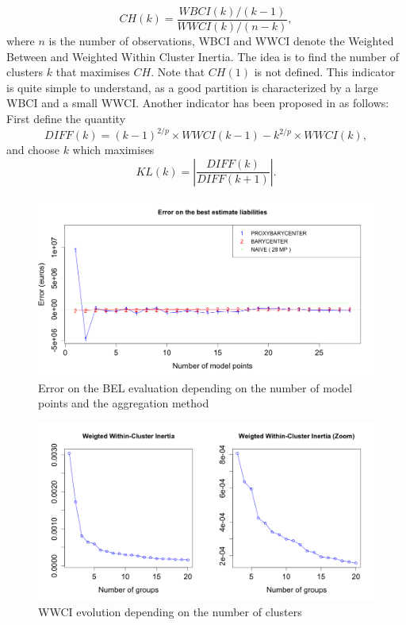 \begin{equation}\label{CH}
CH(k)=\frac{WBCI(k)/(k-1)}{WWCI(k)/(n-k)},
\end{equation}
where $n$ is the number of observations, WBCI and WWCI denote the Weighted Between and Weighted Within Cluster Inertia. The idea is to find the number of clusters $k$ that maximises $CH$. Note that $CH(1)$ is not defined. This indicator is quite simple to understand, as a good partition is characterized by a large WBCI and a small WWCI. Another indicator has been proposed in \citet{KrLa88} as follows: First define the quantity
\begin{equation}\label{CHDefinition}
DIFF(k)=(k-1)^{2/p}\times WWCI(k-1)-k^{2/p}\times WWCI(k),
\end{equation}
and choose $k$ which maximises
\begin{equation}\label{KLDefinition}
KL(k)=\left|\frac{DIFF(k)}{DIFF(k+1)} \right|.
\end{equation}
\begin{center}
	\begin{figure}[ht!]
		\begin{center}
			\includegraphics[width=15cm]{Chapitre6/EcartBel.png}
			\caption{Error on the BEL evaluation depending on the number of model points and the aggregation method}
			\label{BELError}
		\end{center}
	\end{figure}
\end{center}
\begin{center}
	\begin{figure}[ht!]
		\begin{center}
			\includegraphics[width=15cm]{Chapitre6/WCSS.png}
			\caption{WWCI evolution depending on the number of clusters}
			\label{WCSS}
		\end{center}
	\end{figure}
\end{center}
